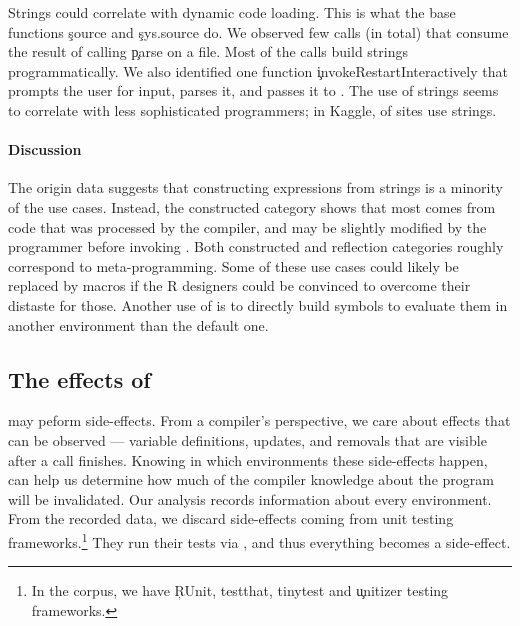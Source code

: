 \documentclass[review,screen,acmsmall]{acmart}
\begin{document}
Strings could correlate with dynamic code loading. This is what the base
functions \c{source} and \c{sys.source} do. We observed few calls
(\packageNbParseFromFileSites in total) that consume the result of calling
\c{parse} on a file. Most of the calls build strings programmatically. We also
identified one function \c{invokeRestartInteractively} that prompts the user for
input, parses it, and passes it to \eval. The use of strings seems to correlate
with less sophisticated programmers; in Kaggle,
\kaggleParseExprsSitePercent of sites use strings.

\paragraph{Discussion}
The origin data suggests that constructing expressions from strings is a
minority of the use cases. Instead, the constructed category shows that most
\evals comes from code that was processed by the compiler, and may be slightly
modified by the programmer before invoking \eval. Both constructed and
reflection categories roughly correspond to meta-programming. Some of these use
cases could likely be replaced by macros if the R designers could be convinced
to overcome their distaste for those. Another use of \eval is to directly build symbols to evaluate them in another environment than the default one.

\subsection{The effects of \eval}

\Eval may peform side-effects. From a compiler's perspective, we care about
effects that can be observed --- \ie variable definitions, updates, and removals
that are visible after a call finishes. Knowing in which environments these
side-effects happen, can help us determine how much of the compiler knowledge
about the program will be invalidated. Our analysis records information about
every environment. From the recorded data, we discard side-effects coming from
unit testing frameworks.\footnote{In the corpus, we have \c{RUnit, testthat,
  tinytest} and \c{unitizer} testing frameworks.} They run their tests via
\eval, and thus everything becomes a side-effect.
\end{document}
